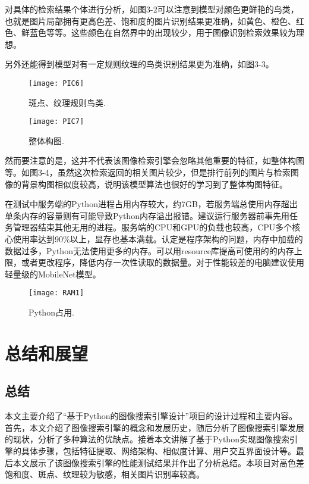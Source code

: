 \documentclass[bachelor_p]{hdu-thesis}
\begin{document}
对具体的检索结果个体进行分析，如图3-2可以注意到模型对颜色更鲜艳的鸟类，也就是图片局部拥有更高色差、饱和度的图片识别结果更准确，如黄色、橙色、红色、鲜蓝色等等。这些颜色在自然界中的出现较少，用于图像识别检索效果较为理想。

另外还能得到模型对有一定规则纹理的鸟类识别结果更为准确，如图3-3。

\begin{figure}[!htb]
  \centering
  \texttt{[image: PIC6]}
  \caption{斑点、纹理规则鸟类.}
  \label{fig_PIC6}
\end{figure}

\begin{figure}[!htb]
  \centering
  \texttt{[image: PIC7]}
  \caption{整体构图.}
  \label{fig_PIC7}
\end{figure}

然而要注意的是，这并不代表该图像检索引擎会忽略其他重要的特征，如整体构图等。如图3-4，虽然这次检索返回的相关图片较少，但是排行前列的图片与检索图像的背景构图相似度较高，说明该模型算法也很好的学习到了整体构图特征。

在测试中服务端的Python进程占用内存较大，约7GB，若服务端总使用内存超出单条内存的容量则有可能导致Python内存溢出报错。建议运行服务器前事先用任务管理器结束其他无用的进程。服务端的CPU和GPU的负载也较高，CPU多个核心使用率达到90$\%$以上，显存也基本满载。认定是程序架构的问题，内存中加载的数据过多，Python无法使用更多的内存。可以用resource库提高可使用的的内存上限，或者更改程序，降低内存一次性读取的数据量。对于性能较差的电脑建议使用轻量级的MobileNet模型。

\begin{figure}[!htb]
  \centering
  \texttt{[image: RAM1]}
  \caption{Python占用.}
  \label{fig_RAM}
\end{figure}

\chapter{总结和展望}

\section{总结}

本文主要介绍了“基于Python的图像搜索引擎设计”项目的设计过程和主要内容。首先，本文介绍了图像搜索引擎的概念和发展历史，随后分析了图像搜索引擎发展的现状，分析了多种算法的优缺点。接着本文讲解了基于Python实现图像搜索引擎的具体步骤，包括特征提取、网络架构、相似度计算、用户交互界面设计等。最后本文展示了该图像搜索引擎的性能测试结果并作出了分析总结。本项目对高色差饱和度、斑点、纹理较为敏感，相关图片识别率较高。
\end{document}
